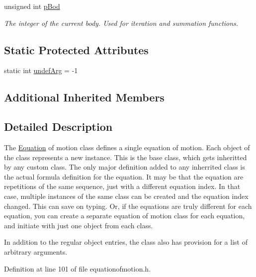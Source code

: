 \begin{DoxyCompactItemize}
unsigned int \hyperlink{classosea_1_1ofreq_1_1_equationof_motion_a5a1c11c4c4a827494a7772af0d0dddc6}{p\-Bod}
\begin{DoxyCompactList}\small\item\em The integer of the current body. Used for iteration and summation functions. \end{DoxyCompactList}\end{DoxyCompactItemize}
\subsection*{Static Protected Attributes}
\begin{DoxyCompactItemize}
\item 
static int \hyperlink{classosea_1_1ofreq_1_1_equationof_motion_ad00063eabf1b5075b04c6d2507acebd4}{undef\-Arg} = -\/1
\end{DoxyCompactItemize}
\subsection*{Additional Inherited Members}


\subsection{Detailed Description}
The \hyperlink{classosea_1_1ofreq_1_1_equation}{Equation} of motion class defines a single equation of motion. Each object of the class represents a new instance. This is the base class, which gets inheritted by any custom class. The only major definition added to any inherrited class is the actual formula definition for the equation. It may be that the equation are repetitions of the same sequence, just with a different equation index. In that case, multiple instances of the same class can be created and the equation index changed. This can save on typing. Or, if the equations are truly different for each equation, you can create a separate equation of motion class for each equation, and initiate with just one object from each class.

In addition to the regular object entries, the class also has provision for a list of arbitrary arguments. 

Definition at line 101 of file equationofmotion.\-h.



